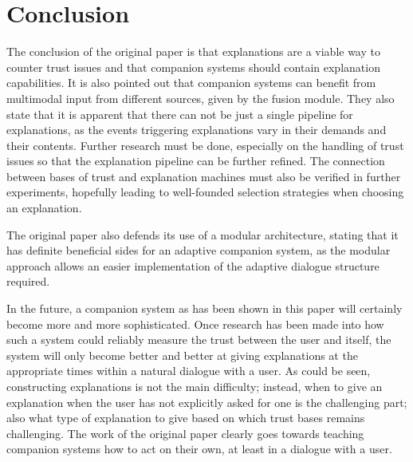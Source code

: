 \documentclass[a4paper]{article}
\begin{document}
\section{Conclusion}

The conclusion of the original paper is that explanations are a viable way to counter trust issues and that companion systems should contain explanation capabilities. It is also pointed out that companion systems can benefit from multimodal input from different sources, given by the fusion module. They also state that it is apparent that there can not be just a single pipeline for explanations, as the events triggering explanations vary in their demands and their contents. Further research must be done, especially on the handling of trust issues so that the explanation pipeline can be further refined. The connection between bases of trust and explanation machines must also be verified in further experiments, hopefully leading to well-founded selection strategies when choosing an explanation.

The original paper also defends its use of a modular architecture, stating that it has definite beneficial sides for an adaptive companion system, as the modular approach allows an easier implementation of the adaptive dialogue structure required.

In the future, a companion system as has been shown in this paper will certainly become more and more sophisticated. Once research has been made into how such a system could reliably measure the trust between the user and itself, the system will only become better and better at giving explanations at the appropriate times within a natural dialogue with a user. As could be seen, constructing explanations is not the main difficulty; instead, when to give an explanation when the user has not explicitly asked for one is the challenging part; also what type of explanation to give based on which trust bases remains challenging. The work of the original paper clearly goes towards teaching companion systems how to act on their own, at least in a dialogue with a user.

\newpage

\end{document}
